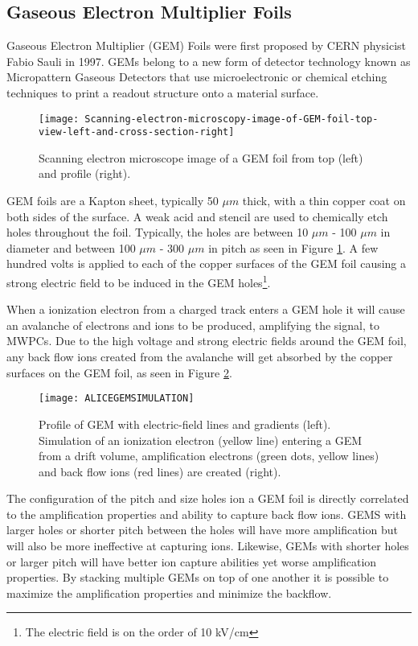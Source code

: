 \subsection{Gaseous Electron Multiplier Foils}
Gaseous Electron Multiplier (GEM) Foils were first proposed by CERN physicist Fabio Sauli in 1997\cite{Sauli:1997qp}.  GEMs belong to a new form of detector technology known as Micropattern Gaseous Detectors\cite{Titov:2013hmq} that use microelectronic or chemical etching techniques to print a readout structure onto a material surface.

\begin{figure}[h]
\texttt{[image: Scanning-electron-microscopy-image-of-GEM-foil-top-view-left-and-cross-section-right]}
\centering
\caption{Scanning electron microscope image of a GEM foil from top (left) and profile (right)\cite{Brucken:2017qjy}.}
\label{fig:GEMpic}
\end{figure}

\noindent
GEM foils are a Kapton sheet, typically 50 $\mu m$ thick, with a thin copper coat on both sides of the surface.  A weak acid and stencil are used to chemically etch holes throughout the foil.  Typically, the holes are between 10 $\mu m$ - 100 $\mu m$ in diameter and between 100 $\mu m$ - 300 $\mu m$ in pitch as seen in Figure \ref{fig:GEMpic}.  A few hundred volts is applied to each of the copper surfaces of the GEM foil causing a strong electric field to be induced in the GEM holes\footnote{The electric field is on the order of 10 kV/cm}.  

When a ionization electron from a charged track enters a GEM hole it will cause an avalanche of electrons and ions to be produced, amplifying the signal, to MWPCs.  Due to the high voltage and strong electric fields around the GEM foil, any back flow ions created from the avalanche will get absorbed by the copper surfaces on the GEM foil, as seen in Figure \ref{fig:GEMefield}.
\begin{figure}[h]
\texttt{[image: ALICEGEMSIMULATION]}
\centering
\caption{Profile of GEM with electric-field lines and gradients (left).  Simulation of an ionization electron (yellow line) entering a GEM from a drift volume, amplification electrons (green dots, yellow lines) and back flow ions (red lines) are created (right)\cite{Bhattacharya:2017yaj}.}
\label{fig:GEMefield}
\end{figure}

\noindent
The configuration of the pitch and size holes ion a GEM foil is directly correlated to the amplification properties and ability to capture back flow ions.  GEMS with larger holes or shorter pitch between the holes will have more amplification but will also be more ineffective at capturing ions.  Likewise, GEMs with shorter holes or larger pitch will have better ion capture abilities yet worse amplification properties.  By stacking multiple GEMs on top of one another it is possible to maximize the amplification properties and minimize the backflow. 

